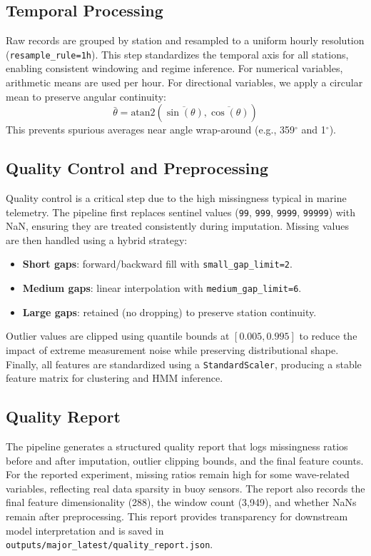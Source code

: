 \documentclass[conference]{IEEEtran}
\begin{document}
\subsection{Temporal Processing}
Raw records are grouped by station and resampled to a uniform hourly resolution (\texttt{resample\_rule=1h}). This step standardizes the temporal axis for all stations, enabling consistent windowing and regime inference. For numerical variables, arithmetic means are used per hour. For directional variables, we apply a circular mean to preserve angular continuity:
\[
\bar{\theta} = \text{atan2}(\overline{\sin(\theta)}, \overline{\cos(\theta)})
\]
This prevents spurious averages near angle wrap-around (e.g., 359$^\circ$ and 1$^\circ$).

\subsection{Quality Control and Preprocessing}
Quality control is a critical step due to the high missingness typical in marine telemetry. The pipeline first replaces sentinel values (\texttt{99}, \texttt{999}, \texttt{9999}, \texttt{99999}) with NaN, ensuring they are treated consistently during imputation. Missing values are then handled using a hybrid strategy:
\begin{itemize}
\item \textbf{Short gaps}: forward/backward fill with \texttt{small\_gap\_limit=2}.
\item \textbf{Medium gaps}: linear interpolation with \texttt{medium\_gap\_limit=6}.
\item \textbf{Large gaps}: retained (no dropping) to preserve station continuity.
\end{itemize}

Outlier values are clipped using quantile bounds at $[0.005, 0.995]$ to reduce the impact of extreme measurement noise while preserving distributional shape. Finally, all features are standardized using a \texttt{StandardScaler}, producing a stable feature matrix for clustering and HMM inference.

\subsection{Quality Report}
The pipeline generates a structured quality report that logs missingness ratios before and after imputation, outlier clipping bounds, and the final feature counts. For the reported experiment, missing ratios remain high for some wave-related variables, reflecting real data sparsity in buoy sensors. The report also records the final feature dimensionality (288), the window count (3{,}949), and whether NaNs remain after preprocessing. This report provides transparency for downstream model interpretation and is saved in \texttt{outputs/major\_latest/quality\_report.json}.
\end{document}

